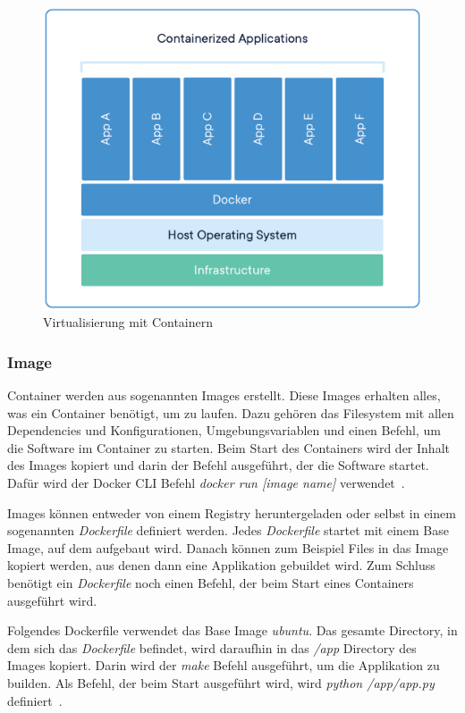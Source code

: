 \begin{figure}[hbt!]
     \centering
     \includegraphics[scale=0.2]{pics/docker-containerized.png}
     \caption{Virtualisierung mit Containern}
 \end{figure}

\subsubsection{Image}
 Container werden aus sogenannten Images erstellt.
 Diese Images erhalten alles, was ein Container benötigt, um zu laufen.
 Dazu gehören das Filesystem mit allen Dependencies und Konfigurationen, Umgebungsvariablen
 und einen Befehl, um die Software im Container zu starten.
 Beim Start des Containers wird der Inhalt des Images kopiert und darin der Befehl ausgeführt, der die Software
 startet.
 Dafür wird der Docker CLI Befehl \textit{docker run [image name]} verwendet~\cite{docker-image}.

 Images können entweder von einem Registry heruntergeladen oder selbst in einem sogenannten \textit{Dockerfile}
 definiert werden.
 Jedes \textit{Dockerfile} startet mit einem Base Image, auf dem aufgebaut wird.
 Danach können zum Beispiel Files in das Image kopiert werden, aus denen dann eine Applikation gebuildet wird.
 Zum Schluss benötigt ein \textit{Dockerfile} noch einen Befehl, der beim Start eines Containers ausgeführt wird.

 Folgendes Dockerfile verwendet das Base Image \textit{ubuntu}.
 Das gesamte Directory, in dem sich das \textit{Dockerfile} befindet, wird daraufhin in das \textit{/app} Directory
 des Images kopiert.
 Darin wird der \textit{make} Befehl ausgeführt, um die Applikation zu builden.
 Als Befehl, der beim Start ausgeführt wird, wird \textit{python /app/app.py} definiert~\cite{dockerfile}.


